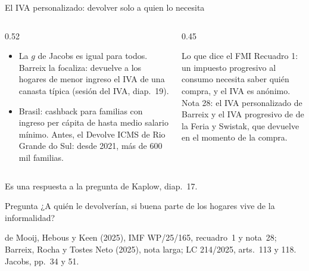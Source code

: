 \documentclass[aspectratio=169,11pt]{beamer}
\newcommand{\fuente}[1]{\par\vfill{\small\color{cGris}#1\par}}
\begin{document}
\begin{frame}{El IVA personalizado: devolver solo a quien lo necesita}
  \begin{columns}[T]
    \begin{column}{0.52\textwidth}
      \begin{itemize}
        \item La $g$ de Jacobs es igual para todos. Barreix la focaliza: devuelve a los hogares de menor ingreso el IVA de una canasta típica (sesión del IVA, diap.~19).
        \item Brasil: cashback para familias con ingreso per cápita de hasta medio salario mínimo. Antes, el Devolve ICMS de Rio Grande do Sul: desde 2021, más de 600 mil familias.
      \end{itemize}
    \end{column}
    \begin{column}{0.45\textwidth}
      \begin{block}{Lo que dice el FMI}
        Recuadro 1: un impuesto progresivo al consumo necesita saber quién compra, y el IVA es anónimo.\\[3pt]
        Nota 28: el IVA personalizado de Barreix y el IVA progresivo de de la Feria y Swistak, que devuelve en el momento de la compra.
      \end{block}
    \end{column}
  \end{columns}
  \pause
  \par\smallskip
  Es una respuesta a la pregunta de Kaplow, diap.~17.
  \pause
  \begin{alertblock}{Pregunta}
    ¿A quién le devolverían, si buena parte de los hogares vive de la informalidad?
  \end{alertblock}
  \fuente{de Mooij, Hebous y Keen (2025), IMF WP/25/165, recuadro~1 y nota~28; Barreix, Rocha y Tostes Neto (2025), nota larga; LC 214/2025, arts.~113 y 118. Jacobs, pp.~34 y 51.}
\end{frame}
\end{document}

